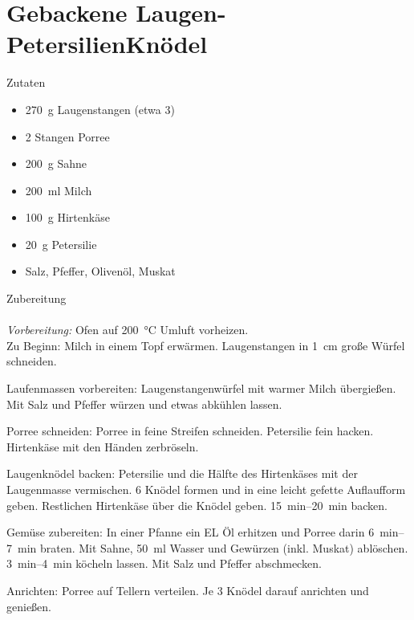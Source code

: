 \section*{Gebackene Laugen-PetersilienKnödel}
\ihead{}\ohead{}
\cfoot{}
{\Large Zutaten}
\begin{multicols}{2}
\begin{itemize}
    \item \SI{270}{g} Laugenstangen (etwa \num{3})
    \item \num{2} Stangen Porree
    \item \SI{200}{g} Sahne
    \item \SI{200}{ml} Milch
    \item \SI{100}{g} Hirtenkäse
    \item \SI{20}{g} Petersilie
    \item Salz, Pfeffer, Olivenöl, Muskat
\end{itemize}
\end{multicols}
\noindent
{\Large Zubereitung}\\
\\
\textit{Vorbereitung:} Ofen auf \SI{200}{\celsius} Umluft vorheizen.\\
Zu Beginn: Milch in einem Topf erwärmen. 
Laugenstangen in \SI{1}{cm} große Würfel schneiden. 

Laufenmassen vorbereiten: Laugenstangenwürfel mit warmer Milch übergießen. 
Mit Salz und Pfeffer würzen und etwas abkühlen lassen. 

Porree schneiden: Porree in feine Streifen schneiden. 
Petersilie fein hacken. 
Hirtenkäse mit den Händen zerbröseln. 

Laugenknödel backen: Petersilie und die Hälfte des Hirtenkäses mit der Laugenmasse vermischen.
\num{6} Knödel formen und in eine leicht gefette Auflaufform geben. 
Restlichen Hirtenkäse über die Knödel geben.
\SIrange{15}{20}{min} backen.

Gemüse zubereiten: In einer Pfanne ein EL Öl erhitzen und Porree darin \SIrange{6}{7}{min} braten. 
Mit Sahne, \SI{50}{ml} Wasser und Gewürzen (inkl. Muskat) ablöschen. 
\SIrange{3}{4}{min} köcheln lassen. 
Mit Salz und Pfeffer abschmecken. 

Anrichten: Porree auf Tellern verteilen. 
Je \num{3} Knödel darauf anrichten und genießen. 